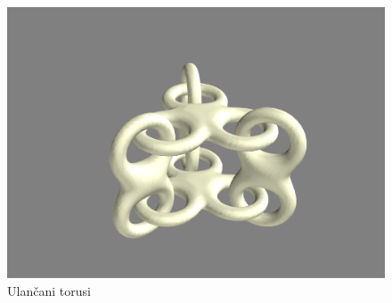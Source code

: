 \documentclass[a4paper,12pt]{article}
\theoremstyle{zad}
\begin{document}
\begin{figure}
\centering
\includegraphics[scale=0.12]{torusi1.png}
\caption{Ulančani torusi}\label{model}
\end{figure}
\end{document}
